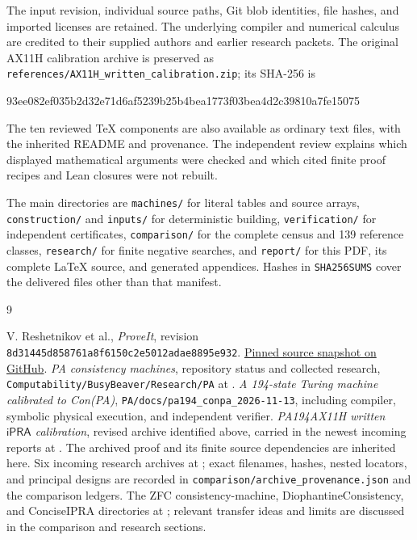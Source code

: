 \documentclass[11pt,letterpaper]{article}
\theoremstyle{definition}
\newcommand{\ipra}{\mathsf{iPRA}}
\newcommand{\code}[1]{\texttt{#1}}
\begin{document}
The input revision, individual source paths, Git blob identities, file
hashes, and imported licenses are retained. The underlying compiler and
numerical calculus are credited to their supplied authors and earlier
research packets. The original AX11H calibration archive is preserved as
\code{references/AX11H\_written\_calibration.zip}; its SHA-256 is
\begin{center}\small\ttfamily
93ee082ef035b2d32e71d6af5239b25b4bea1773f03bea4d2c39810a7fe15075
\end{center}
The ten reviewed TeX components are also available as ordinary text files,
with the inherited README and provenance. The independent review explains
which displayed mathematical arguments were checked and which cited
finite proof recipes and Lean closures were not rebuilt.

The main directories are \code{machines/} for literal tables and source
arrays, \code{construction/} and \code{inputs/} for deterministic building,
\code{verification/} for independent certificates,
\code{comparison/} for the complete census and 139 reference classes,
\code{research/} for finite negative searches, and \code{report/} for this
PDF, its complete LaTeX source, and generated appendices. Hashes in
\code{SHA256SUMS} cover the delivered files other than that manifest.

\begingroup\footnotesize
\begin{thebibliography}{9}
\raggedright
\setlength{\itemsep}{4pt}
\setlength{\parsep}{0pt}
 V. Reshetnikov et al., \emph{ProveIt}, revision
\texttt{8d31445d858761a8f6150c2e5012adae8895e932}.
\href{https://github.com/VladimirReshetnikov/ProveIt/tree/8d31445d858761a8f6150c2e5012adae8895e932}{Pinned source snapshot on GitHub}.
 \emph{PA consistency machines}, repository status and collected
research, \code{Computability/BusyBeaver/Research/PA} at \cite{snapshot}.
 \emph{A 194-state Turing machine calibrated to Con(PA)},
\code{PA/docs/pa194\_conpa\_2026-11-13}, including compiler, symbolic
physical execution, and independent verifier.
 \emph{PA194AX11H written $\ipra$ calibration}, revised archive
identified above, carried in the newest incoming reports at \cite{snapshot}.
The archived proof and its finite source dependencies are inherited here.
 Six incoming research archives at \cite{snapshot}; exact
filenames, hashes, nested locators, and principal designs are recorded in
\code{comparison/archive\_provenance.json} and the comparison ledgers.
 The ZFC consistency-machine,
DiophantineConsistency, and ConciseIPRA directories at \cite{snapshot};
relevant transfer ideas and limits are discussed in the comparison and
research sections.
\end{thebibliography}
\endgroup
\end{document}
